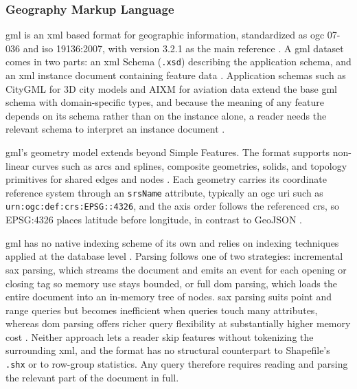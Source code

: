 \subsubsection{Geography Markup Language}
\label{background:spatial-data-formats-and-storage-models:file-formats:geography-markup-language}
\acrfull{gml} is an \acrfull{xml} based format for geographic information, standardized as \acrshort{ogc} 07-036 and \acrfull{iso} 19136:2007, with version 3.2.1 as the main reference \parencite{ogc2007_07036_gml_specification}. A \acrshort{gml} dataset comes in two parts: an \acrshort{xml} Schema (\texttt{.xsd}) describing the application schema, and an \acrshort{xml} instance document containing feature data \parencite{ogc2007_07036_gml_specification}. Application schemas such as CityGML for 3D city models and AIXM for aviation data extend the base \acrshort{gml} schema with domain-specific types, and because the meaning of any feature depends on its schema rather than on the instance alone, a reader needs the relevant schema to interpret an instance document \parencite{wikipedia2026_geography_markup_language}.

\acrshort{gml}'s geometry model extends beyond Simple Features. The format supports non-linear curves such as arcs and splines, composite geometries, solids, and topology primitives for shared edges and nodes \parencite{ogc2007_07036_gml_specification}. Each geometry carries its coordinate reference system through an \texttt{srsName} attribute, typically an \acrshort{ogc} \acrfull{uri} such as \texttt{urn:ogc:def:crs:EPSG::4326}, and the axis order follows the referenced \acrshort{crs}, so EPSG:4326 places latitude before longitude, in contrast to GeoJSON \parencite{gdal2025_gml_driver}.

\acrshort{gml} has no native indexing scheme of its own and relies on indexing techniques applied at the database level \parencite{lu2005_advances_in_gml_geospatial_applications}. Parsing follows one of two strategies: incremental \acrfull{sax} parsing, which streams the document and emits an event for each opening or closing tag so memory use stays bounded, or full \acrfull{dom} parsing, which loads the entire document into an in-memory tree of nodes. \acrshort{sax} parsing suits point and range queries but becomes inefficient when queries touch many attributes, whereas \acrshort{dom} parsing offers richer query flexibility at substantially higher memory cost \parencite{lu2005_advances_in_gml_geospatial_applications}. Neither approach lets a reader skip features without tokenizing the surrounding \acrshort{xml}, and the format has no structural counterpart to Shapefile's \texttt{.shx} or to row-group statistics. Any query therefore requires reading and parsing the relevant part of the document in full.

